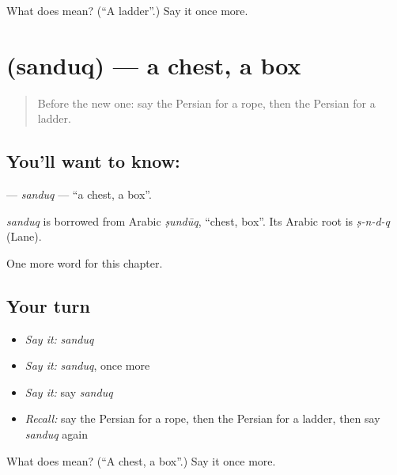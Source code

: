 \begin{tcolorbox}[breakable,colback=teal!4,colframe=teal!35!black,title={Before you move on}]
What does  mean? (\textquotedblleft{}A ladder\textquotedblright{}.) Say it once more.
\end{tcolorbox}
\section[\texorpdfstring{\fa{صندوق} (sanduq)}{صندوق (sanduq)}]{ (sanduq) — a chest, a box}

\label{lesson:FA-C112-sanduq}



\begin{quote}
Before the new one: say the Persian for a rope, then the Persian for a ladder.
\end{quote}

\subsection*{You'll want to know: }
\textbf{} — \emph{sanduq} — \textquotedblleft{}a chest, a box\textquotedblright{}.

\begin{cousinweb}
\emph{sanduq} is borrowed from Arabic \emph{ṣundūq}, \textquotedblleft{}chest, box\textquotedblright{}. Its Arabic root is \emph{ṣ-n-d-q} (Lane).
\end{cousinweb}

\begin{grammarlens}[title={What you've built}]
One more word for this chapter.
\end{grammarlens}

\subsection*{Your turn}
\begin{itemize}
\raggedright
  \item \emph{Say it:} \emph{sanduq}
  \item \emph{Say it:} \emph{sanduq}, once more
  \item \emph{Say it:} say \emph{sanduq}
  \item \emph{Recall:} say the Persian for a rope, then the Persian for a ladder, then say \emph{sanduq} again
\end{itemize}

\begin{tcolorbox}[breakable,colback=teal!4,colframe=teal!35!black,title={Before you move on}]
What does  mean? (\textquotedblleft{}A chest, a box\textquotedblright{}.) Say it once more.
\end{tcolorbox}
